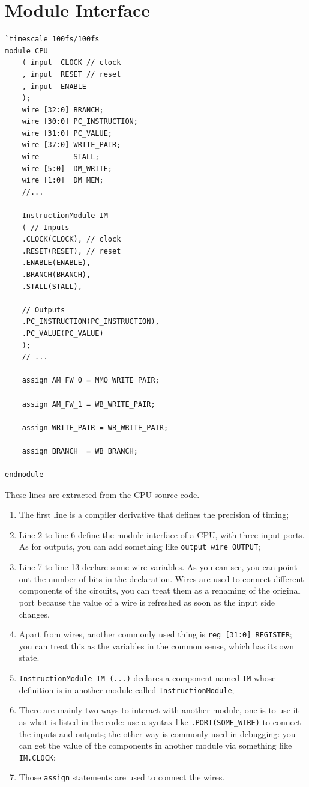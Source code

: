\documentclass[a4paper,12pt, oneside]{book}
\begin{document}
\section{Module Interface}
\begin{verbatim}
`timescale 100fs/100fs
module CPU 
    ( input  CLOCK // clock
    , input  RESET // reset
    , input  ENABLE
    );
    wire [32:0] BRANCH;
    wire [30:0] PC_INSTRUCTION;
    wire [31:0] PC_VALUE;
    wire [37:0] WRITE_PAIR;
    wire        STALL;
    wire [5:0]  DM_WRITE;
    wire [1:0]  DM_MEM;
    //...

    InstructionModule IM
    ( // Inputs
    .CLOCK(CLOCK), // clock
    .RESET(RESET), // reset
    .ENABLE(ENABLE),
    .BRANCH(BRANCH),
    .STALL(STALL),

    // Outputs
    .PC_INSTRUCTION(PC_INSTRUCTION),
    .PC_VALUE(PC_VALUE)
    );
    // ...

    assign AM_FW_0 = MMO_WRITE_PAIR;

    assign AM_FW_1 = WB_WRITE_PAIR;

    assign WRITE_PAIR = WB_WRITE_PAIR;

    assign BRANCH  = WB_BRANCH;
    
endmodule
\end{verbatim}
These lines are extracted from the CPU source code. 
\begin{enumerate}
	\item The first line is a compiler derivative that defines the precision of timing;
	\item Line 2 to line 6 define the module interface of a CPU, with three input ports. As for outputs, you can add something like \texttt{output wire OUTPUT};
	\item Line 7 to line 13 declare some wire variables. As you can see, you can point out the number of bits in the declaration. Wires are used to connect different components of the circuits, you can treat them as a renaming of the original port because the value of a wire is refreshed as soon as the input side changes.
	\item Apart from wires, another commonly used thing is \texttt{reg [31:0] REGISTER}; you can treat this as the variables in the common sense, which has its own state.
	\item \texttt{InstructionModule IM (...)} declares a component named \texttt{IM} whose definition is in another module called \texttt{InstructionModule};
	\item There are mainly two ways to interact with another module, one is to use it as what is listed in the code: use a syntax like \texttt{.PORT(SOME_WIRE)} to connect the inputs and outputs; the other way is commonly used in debugging: you can get the value of the components in another module via something like \texttt{IM.CLOCK};
	\item Those \texttt{assign} statements are used to connect the wires.
\end{enumerate}
\end{document}
